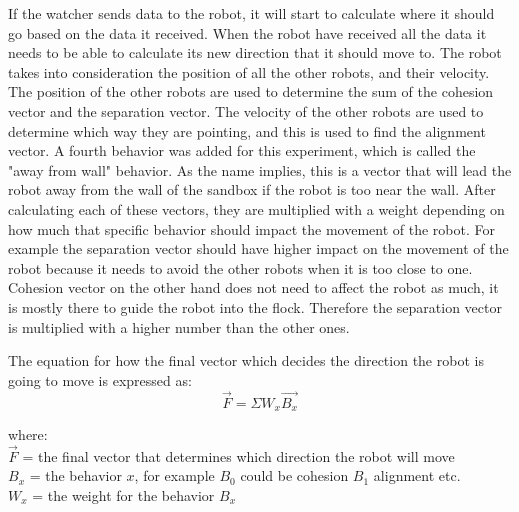 If the watcher sends data to the robot, it will start to calculate where it should go based on the data it received. 
When the robot have received all the data it needs to be able to calculate its new direction that it should move to. The robot takes into consideration the position of all the other robots, and their velocity. The position of the other robots are used to determine the sum of the cohesion vector and the separation vector. The velocity of the other robots are used to determine which way they are pointing, and this is used to find the alignment vector. A fourth behavior was added for this experiment, which is called the "away from wall" behavior. As the name implies, this is a vector that will lead the robot away from the wall of the sandbox if the robot is too near the wall. After calculating each of these vectors, they are multiplied with a weight depending on how much that specific behavior should impact the movement of the robot. For example the separation vector should have higher impact on the movement of the robot because it needs to avoid the other robots when it is too close to one. Cohesion vector on the other hand does not need to affect the robot as much, it is mostly there to guide the robot into the flock. Therefore the separation vector is multiplied with a higher number than the other ones.

The equation for how the final vector which decides the direction the robot is going to move is expressed as:
\begin{equation}
\label{eq:vecsum}
\vec{F} = \Sigma W_x\vec{B_x}
\end{equation}

where:
\\
$\vec{F}$ = the final vector that determines which direction the robot will move
\\
$B_x$ = the behavior $x$, for example $B_0$ could be cohesion $B_1$ alignment etc.
\\
$W_x$ = the weight for the behavior $B_x$\\



